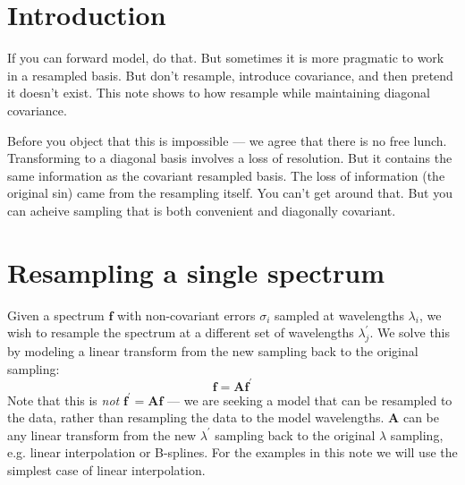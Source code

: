 \documentclass[12pt]{article}
\newcommand{\A}{\mathbf{A}}
\newcommand{\f}{\mathbf{f}}
\begin{document}
\maketitle


\section{Introduction}

If you can forward model, do that.  But sometimes it is more pragmatic
to work in a resampled basis.  But don't resample, introduce covariance,
and then pretend it doesn't exist.  This note shows to how resample while
maintaining diagonal covariance.

Before you object that this is impossible --- we agree that there is no
free lunch.  Transforming to a diagonal basis involves a loss of resolution.
But it contains the same information as the covariant resampled basis.
The loss of information (the original sin) came from the resampling itself.
You can't get around that.  But you can acheive sampling that is both
convenient and diagonally covariant.

\section{Resampling a single spectrum}
\label{sec:single_spec}

Given a spectrum $\f$ with non-covariant errors $\sigma_i$ sampled at
wavelengths $\lambda_i$, we wish to resample the spectrum at a different
set of wavelengths $\lambda_j^\prime$.
We solve this by modeling a linear transform from the new
sampling back to the original sampling:
\begin{equation}
    \f = \A \f^\prime
\end{equation}
Note that this is {\em not} $\f^\prime = \A \f$ --- we are seeking a model
that can be resampled to the data, rather than resampling the data to the
model wavelengths.
$\A$ can be any linear transform from the new $\lambda^\prime$ sampling
back to the original $\lambda$ sampling, e.g. linear interpolation or
B-splines.  For the examples in this note we will use the simplest case
of linear interpolation.
\end{document}
